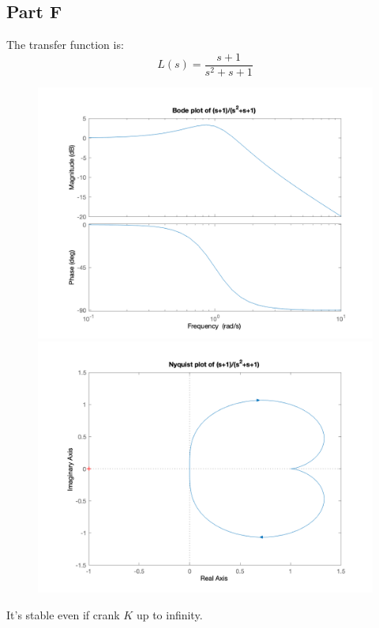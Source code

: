 \documentclass[a4paper]{article}
\begin{document}
\subsection{Part F} 
The transfer function is:
$$
L(s) = \frac{s+1}{s^2+s+1}
$$
\begin{figure}[H]
\centering
\begin{minipage}[t]{0.48\textwidth}
\centering
\includegraphics[width=\textwidth]{pic/11.png}
\end{minipage}
\begin{minipage}[t]{0.48\textwidth}
\centering
\includegraphics[width=\textwidth]{pic/12.png}
\end{minipage}
\end{figure}
It's stable even if crank $K$ up to infinity.
\end{document}
